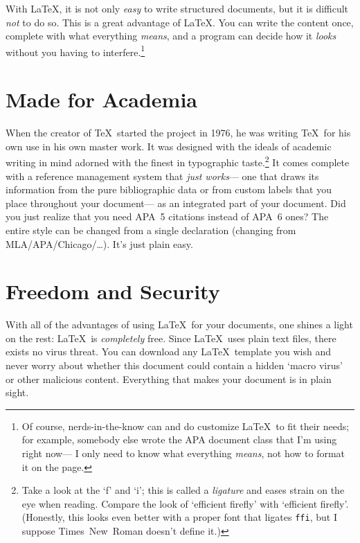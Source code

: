 \documentclass{smcm-psyc-paper}
\begin{document}
With \LaTeX, it is not only \emph{easy} to write structured documents,
  but it is difficult \emph{not} to do so.
This is a great advantage of \LaTeX.
You can write the content once,
  complete with what everything \emph{means},
  and a program can decide how it \emph{looks}
  without you having to interfere.\footnote{%
    Of course, nerds-in-the-know can and do customize \LaTeX\ to fit their needs;
    for example, somebody else wrote the APA document class that I'm using right now---%
    I only need to know what everything \emph{means},
    not how to format it on the page.}

\section{Made for Academia}
When the creator of \TeX\ started the project in 1976,
  he was writing \TeX\ for his own use in his own master work.
It was designed with the ideals of academic writing in mind
  adorned with the finest in typographic taste.\footnote{%
    Take a look at the `f' and `i';
    this is called a \textit{ligature} and eases strain on the eye when reading.
    Compare the look of `ef{}f{}icient f{}iref{}ly' with `efficient firefly'.
    (Honestly, this looks even better with a proper font that ligates \texttt{ffi},
    but I suppose Times~New~Roman doesn't define it.)}
It comes complete with a reference management system that \emph{just works}---%
  one that draws its information from the pure bibliographic data
  or from custom labels that you place throughout your document---%
  as an integrated part of your document.
Did you just realize that you need APA~5 citations instead of APA~6 ones?
The entire style can be changed from a single declaration
  (changing from MLA\slash APA\slash Chicago\slash\dots).
It's just plain easy.

\section{Freedom and Security}
With all of the advantages of using \LaTeX\ for your documents,
  one shines a light on the rest: %
  \LaTeX\ is \emph{completely} free.
Since \LaTeX\ uses plain text files,
  there exists no virus threat.
You can download any \LaTeX\ template you wish and
  never worry about whether this document
  could contain a hidden `macro virus'
  or other malicious content.
Everything that makes your document
  is in plain sight.
\end{document}
